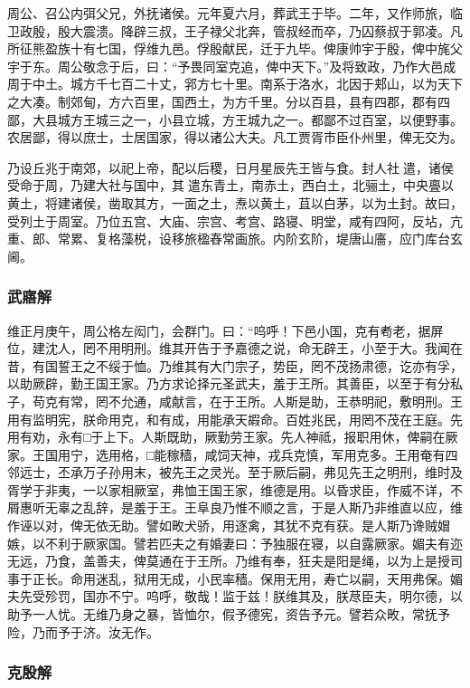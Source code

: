 \documentclass[]{article}
\begin{document}
周公、召公内弭父兄，外抚诸侯。元年夏六月，葬武王于毕。二年，又作师旅，临卫政殷，殷大震溃。降辟三叔，王子禄父北奔，管叔经而卒，乃囚蔡叔于郭凌。凡所征熊盈族十有七国，俘维九邑。俘殷献民，迁于九毕。俾康帅宇于殷，俾中旄父宇于东。周公敬念于后，曰：``予畏同室克追，俾中天下。''及将致政，乃作大邑成周于中土。城方千七百二十丈，郛方七十里。南系于洛水，北因于郏山，以为天下之大凑。制郊甸，方六百里，国西土，为方千里。分以百县，县有四郡，郡有四鄙，大县城方王城三之一，小县立城，方王城九之一。都鄙不过百室，以便野事。农居鄙，得以庶士，士居国家，得以诸公大夫。凡工贾胥市臣仆州里，俾无交为。

乃设丘兆于南郊，以祀上帝，配以后稷，日月星辰先王皆与食。封人社遣，诸侯受命于周，乃建大社与国中，其遣东青土，南赤土，西白土，北骊土，中央亹以黄土，将建诸侯，凿取其方，一面之土，焘以黄土，苴以白茅，以为土封。故曰，受列土于周室。乃位五宫、大庙、宗宫、考宫、路寝、明堂，咸有四阿，反坫，亢重、郎、常累、复格藻棁，设移旅楹舂常画旅。内阶玄阶，堤唐山廧，应门库台玄阃。

\hypertarget{header-n195}{%
\subsubsection{武寤解}\label{header-n195}}

维正月庚午，周公格左闳门，会群门。曰：``呜呼！下邑小国，克有耇老，据屏位，建沈人，罔不用明刑。维其开告于予嘉德之说，命无辟王，小至于大。我闻在昔，有国誓王之不绥于恤。乃维其有大门宗子，势臣，罔不茂扬肃德，讫亦有孚，以助厥辟，勤王国王家。乃方求论择元圣武夫，羞于王所。其善臣，以至于有分私子，苟克有常，罔不允通，咸献言，在于王所。人斯是助，王恭明祀，敷明刑。王用有监明宪，朕命用克，和有成，用能承天嘏命。百姓兆民，用罔不茂在王庭。先用有劝，永有□于上下。人斯既助，厥勤劳王家。先人神祗，报职用休，俾嗣在厥家。王国用宁，选用格，□能稼穑，咸饲天神，戎兵克慎，军用克多。王用奄有四邻远士，丕承万子孙用末，被先王之灵光。至于厥后嗣，弗见先王之明刑，维时及胥学于非夷，一以家相厥室，弗恤王国王家，维德是用。以昏求臣，作威不详，不屑惠听无辜之乱辞，是羞于王。王阜良乃惟不顺之言，于是人斯乃非维直以应，维作诬以对，俾无依无助。譬如畋犬骄，用逐禽，其犹不克有获。是人斯乃谗贼媢嫉，以不利于厥家国。譬若匹夫之有婚妻曰：予独服在寝，以自露厥家。媚夫有迩无远，乃食，盖善夫，俾莫通在于王所。乃维有奉，狂夫是阳是绳，以为上是授司事于正长。命用迷乱，狱用无成，小民率穑。保用无用，寿亡以嗣，天用弗保。媚夫先受殄罚，国亦不宁。呜呼，敬哉！监于兹！朕维其及，朕荩臣夫，明尔德，以助予一人忧。无维乃身之暴，皆恤尔，假予德宪，资告予元。譬若众畋，常抚予险，乃而予于济。汝无作。

\hypertarget{header-n199}{%
\subsubsection{克殷解}\label{header-n199}}
\end{document}
